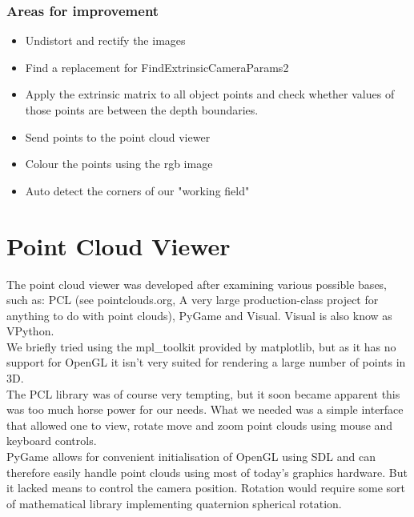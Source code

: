 \subsubsection{Areas for improvement}

\begin{itemize}

\item Undistort and rectify the images%

\item Find a replacement for FindExtrinsicCameraParams2%

\item Apply the extrinsic matrix to all object points and check whether values
of those points are between the depth boundaries.%

\item Send points to the point cloud viewer%

\item Colour the points using the rgb image%

\item Auto detect the corners of our "working field"%

\end{itemize}

\section{Point Cloud Viewer}

The point cloud viewer was developed after examining various possible bases,
such as: PCL (see pointclouds.org, A very large production-class project for
anything to do with point clouds), PyGame and Visual. Visual is also know as
VPython.\\

We briefly tried using the mpl\_toolkit provided by matplotlib, but as it has no
support for OpenGL it isn't very suited for rendering a large number of points
in 3D.\\

The PCL library was of course very tempting, but it soon became apparent this
was too much horse power for our needs. What we needed was a simple interface
that allowed one to view, rotate move and zoom point clouds using mouse and
keyboard controls.\\

PyGame allows for convenient initialisation of OpenGL using SDL and can
therefore easily handle point clouds using most of today's graphics hardware.
But it lacked means to control the camera position. Rotation would require some
sort of mathematical library implementing quaternion spherical rotation.\\

